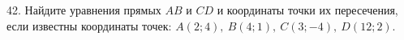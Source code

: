 42. Найдите уравнения прямых $AB$ и $CD$ и координаты точки их пересечения, если известны координаты точек: $A(2;4),\ B(4;1),\ C(3;-4),\ D(12;2).$\\

